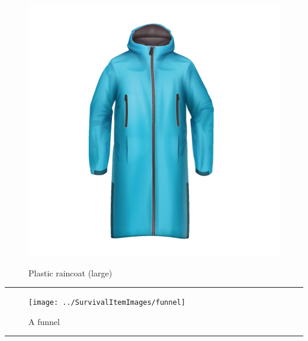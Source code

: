 \documentclass{article}
\begin{document}
    \begin{figure}[H]
        \centering
        \begin{minipage}{0.25\textwidth}
            \centering
            \includegraphics[width=\textwidth]{../SurvivalItemImages/plasticraincoat}
        \end{minipage}\hfill
        \begin{minipage}{0.7\textwidth}
            \centering
            \Large Plastic raincoat (large)
        \end{minipage}
    \end{figure}
    \vspace{-0.8em}
    \noindent\rule{\textwidth}{0.4pt}
            
    \begin{figure}[H]
        \centering
        \begin{minipage}{0.25\textwidth}
            \centering
            \texttt{[image: ../SurvivalItemImages/funnel]}
        \end{minipage}\hfill
        \begin{minipage}{0.7\textwidth}
            \centering
            \Large A funnel
        \end{minipage}
    \end{figure}
    \vspace{-0.8em}
    \noindent\rule{\textwidth}{0.4pt}
            
\end{document}
